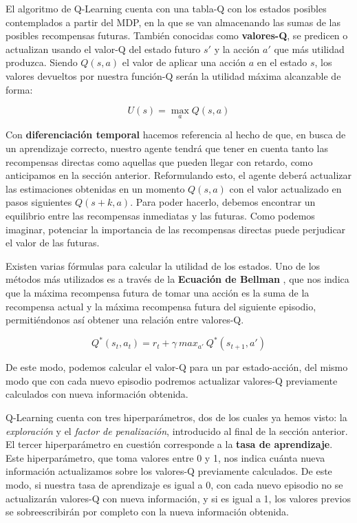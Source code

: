 El algoritmo de Q-Learning cuenta con una tabla-Q con los estados posibles contemplados a partir del MDP, en la que se van almacenando las sumas de las posibles recompensas futuras. También conocidas como \textbf{valores-Q}, se predicen o actualizan usando el valor-Q del estado futuro $s'$ y la acción $a'$ que más utilidad produzca. Siendo $Q(s, a)$ el valor de aplicar una acción $a$ en el estado $s$, los valores devueltos por nuestra función-Q serán la utilidad máxima alcanzable de forma:

$$U(s) = \max_{a}Q(s, a)$$

Con \textbf{diferenciación temporal} hacemos referencia al hecho de que, en busca de un aprendizaje correcto, nuestro agente tendrá que tener en cuenta tanto las recompensas directas como aquellas que pueden llegar con retardo, como anticipamos en la sección anterior. Reformulando esto, el agente deberá actualizar las estimaciones obtenidas en un momento $Q(s, a)$ con el valor actualizado en pasos siguientes $Q(s+k, a)$. Para poder hacerlo, debemos encontrar un equilibrio entre las recompensas inmediatas y las futuras. Como podemos imaginar, potenciar la importancia de las recompensas directas puede perjudicar el valor de las futuras.

Existen varias fórmulas para calcular la utilidad de los estados. Uno de los métodos más utilizados es a través de la \textbf{Ecuación de Bellman} \citep{Baird1995}, que nos indica que la máxima recompensa futura de tomar una acción es la suma de la recompensa actual y la máxima recompensa futura del siguiente episodio, permitiéndonos así obtener una relación entre valores-Q.

$$Q^*(s_{t}, a_{t}) = r_{t} + \gamma\ max_{a'}\ Q^*(s_{t+1}, a')$$

De este modo, podemos calcular el valor-Q para un par estado-acción, del mismo modo que con cada nuevo episodio podremos actualizar valores-Q previamente calculados con nueva información obtenida.

Q-Learning cuenta con tres hiperparámetros, dos de los cuales ya hemos visto: la \textit{exploración} y el \textit{factor de penalización}, introducido al final de la sección anterior. El tercer hiperparámetro en cuestión corresponde a la \textbf{tasa de aprendizaje}. Este hiperparámetro, que toma valores entre 0 y 1, nos indica cuánta nueva información actualizamos sobre los valores-Q previamente calculados. De este modo, si nuestra tasa de aprendizaje es igual a 0, con cada nuevo episodio no se actualizarán valores-Q con nueva información, y si es igual a 1, los valores previos se sobreescribirán por completo con la nueva información obtenida.

